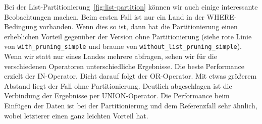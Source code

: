 Bei der List-Partitionierung~\ref{fig:list-partition} können wir auch einige interessante Beobachtungen machen.
Beim ersten Fall ist nur ein Land in der WHERE-Bedingung vorhanden.
Wenn dies so ist, dann hat die Partitionierung einen erheblichen Vorteil gegenüber der Version ohne Partitionierung (siehe rote Linie von \texttt{with\_pruning\_simple} und braune von \texttt{without\_list\_pruning\_simple}).
Wenn wir statt nur eines Landes mehrere abfragen, sehen wir für die verschiedenen Operatoren unterschiedliche Ergebnisse.
Die beste Performance erzielt der IN-Operator.
Dicht darauf folgt der OR-Operator.
Mit etwas größerem Abstand liegt der Fall ohne Partitionierung.
Deutlich abgeschlagen ist die Verbindung der Ergebnisse per UNION-Operator.
Die Performance beim Einfügen der Daten ist bei der Partitionierung und dem Referenzfall sehr ähnlich, wobei letzterer einen ganz leichten Vorteil hat.

